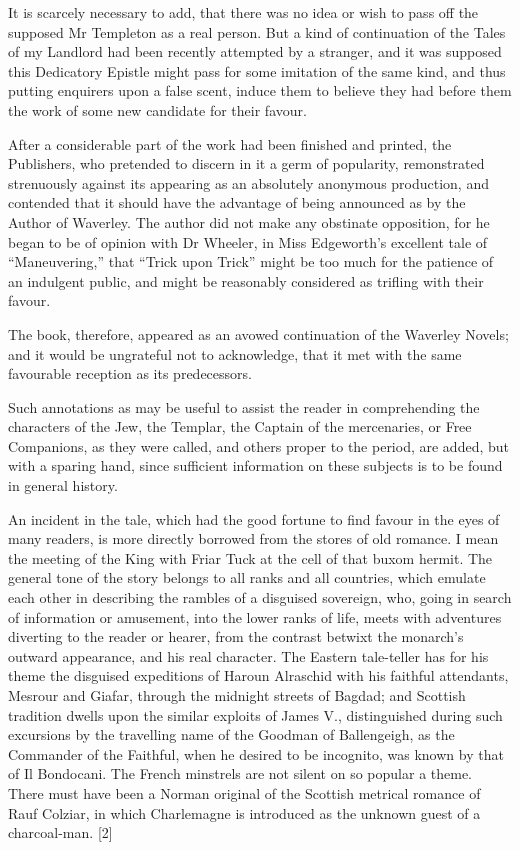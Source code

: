 It is scarcely necessary to add, that there was no idea or wish to pass
off the supposed Mr Templeton as a real person. But a kind of
continuation of the Tales of my Landlord had been recently attempted by
a stranger, and it was supposed this Dedicatory Epistle might pass for
some imitation of the same kind, and thus putting enquirers upon a false
scent, induce them to believe they had before them the work of some new
candidate for their favour.

After a considerable part of the work had been finished and printed, the
Publishers, who pretended to discern in it a germ of popularity,
remonstrated strenuously against its appearing as an absolutely
anonymous production, and contended that it should have the advantage of
being announced as by the Author of Waverley. The author did not make
any obstinate opposition, for he began to be of opinion with Dr Wheeler,
in Miss Edgeworth's excellent tale of ``Maneuvering,'' that ``Trick upon
Trick'' might be too much for the patience of an indulgent public, and
might be reasonably considered as trifling with their favour.

The book, therefore, appeared as an avowed continuation of the Waverley
Novels; and it would be ungrateful not to acknowledge, that it met with
the same favourable reception as its predecessors.

Such annotations as may be useful to assist the reader in comprehending
the characters of the Jew, the Templar, the Captain of the mercenaries,
or Free Companions, as they were called, and others proper to the
period, are added, but with a sparing hand, since sufficient information
on these subjects is to be found in general history.

An incident in the tale, which had the good fortune to find favour in
the eyes of many readers, is more directly borrowed from the stores of
old romance. I mean the meeting of the King with Friar Tuck at the cell
of that buxom hermit. The general tone of the story belongs to all ranks
and all countries, which emulate each other in describing the rambles of
a disguised sovereign, who, going in search of information or amusement,
into the lower ranks of life, meets with adventures diverting to the
reader or hearer, from the contrast betwixt the monarch's outward
appearance, and his real character. The Eastern tale-teller has for his
theme the disguised expeditions of Haroun Alraschid with his faithful
attendants, Mesrour and Giafar, through the midnight streets of Bagdad;
and Scottish tradition dwells upon the similar exploits of James V.,
distinguished during such excursions by the travelling name of the
Goodman of Ballengeigh, as the Commander of the Faithful, when he
desired to be incognito, was known by that of Il Bondocani. The French
minstrels are not silent on so popular a theme. There must have been a
Norman original of the Scottish metrical romance of Rauf Colziar, in
which Charlemagne is introduced as the unknown guest of a charcoal-man.
{[}2{]}

